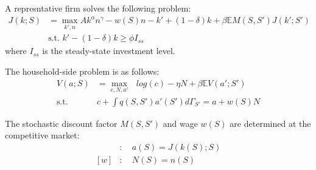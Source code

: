 A represntative firm solves the following problem:
\begin{align*}
  J(k;S) &= \max_{k',n} Ak^{\alpha}n^{\gamma} -w(S)n -k' + (1-\delta)k + \beta\mathbb{E}M(S,S')J(k';S')
  \\
  &\text{s.t. } k' - (1-\delta)k \geq \phi I_{ss}
\end{align*}
where $I_{ss}$ is the steady-state investment level.

The household-side problem is as follows:
\begin{align*}
  V(a;S) &= \max_{c,N,a'}\text{ } log(c) - \eta N + \beta \mathbb{E}V(a';S')
  \\
  \text{s.t.}\quad& c + \int q(S,S') a'(S') d\Gamma_{S'} =  a + w(S)N
\end{align*}

The stochastic discount factor $M(S,S')$ and wage $w(S)$ are determined at the competitive market:
\begin{align*}
  [M]&:\quad a(S) = J(k(S);S)
  \\
  [w]&:\quad N(S) = n(S)
\end{align*}

